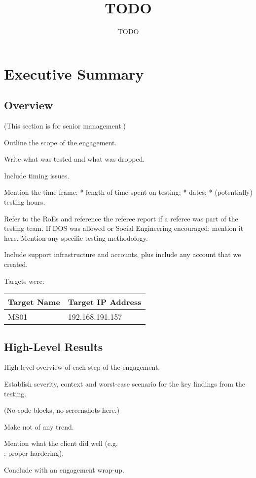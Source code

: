 \documentclass[a4paper, 12pt]{report}
\title{TODO}
\author{TODO}
\begin{document}
\maketitle

\tableofcontents

\chapter{Executive Summary}
\section{Overview}
(This section is for senior management.)

Outline the scope of the engagement.

Write what was tested and what was dropped.

Include timing issues.

Mention the time frame:
	* length of time spent on testing;
	* dates;
	* (potentially) testing hours.

Refer to the RoEs and reference the referee report if a referee was part of
the testing team.
If DOS was allowed or Social Engineering encouraged: mention it here.
Mention any specific testing methodology.

Include support infrastructure and accounts, plus include any account that we
created.

Targets were:

\begin{tabular}{ll}
	\toprule
	Target Name & Target IP Address \\
	\midrule
	 MS01 & 192.168.191.157\\
	\bottomrule
\end{tabular}

\section{High-Level Results}
High-level overview of each step of the engagement.

Establish severity, context and worst-case scenario for the key findings from
the testing.

(No code blocks, no screenshots here.)

Make not of any trend.

Mention what the client did well (e.g.\\: proper hardering).

Conclude with an engagement wrap-up.
\end{document}
